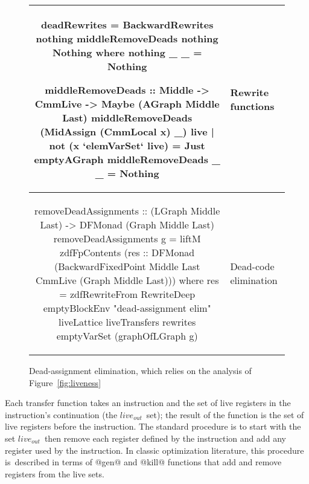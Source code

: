 \documentclass[blockstyle,preprint,nocopyrightspace]{sigplanconf}
\newcommand\seclabel[1]{\label{sec:#1}}
\newcommand\figref[1]{Figure~\ref{fig:#1}}
\newcommand\figlabel[1]{\label{fig:#1}}
\begin{document}
\seclabel{bwd-rewrite}

\begin{figure*}
\begin{tabular}{CL}
\T\begin{code}
deadRewrites = BackwardRewrites nothing middleRemoveDeads nothing Nothing
  where nothing _ _ = Nothing

middleRemoveDeads :: Middle -> CmmLive -> Maybe (AGraph Middle Last)
middleRemoveDeads (MidAssign (CmmLocal x) _) live
    | not (x `elemVarSet` live) = Just emptyAGraph
middleRemoveDeads _ _ = Nothing
\end{code}\B
& Rewrite \mbox{functions}\\
\hline

\T\begin{code}
removeDeadAssignments :: (LGraph Middle Last) -> DFMonad (Graph Middle Last)
removeDeadAssignments g =
   liftM zdfFpContents (res :: DFMonad (BackwardFixedPoint Middle Last
                                            CmmLive (Graph Middle Last)))
     where res = zdfRewriteFrom RewriteDeep emptyBlockEnv "dead-assignment elim"
                                liveLattice liveTransfers rewrites emptyVarSet
                                (graphOfLGraph g)
\end{code}%
& \mbox{Dead-code} elimination\\
\end{tabular}
\caption{Dead-assignment elimination, which relies on the analysis of
\figref{liveness}} 
\figlabel{dead-elim}
\end{figure*}

\def\liveout{$\mathit{live_{out}}$}
Each transfer function takes an instruction and
the set of live registers in the instruction's continuation (the \liveout\ set);
the result of the function is the set of live registers before the instruction.
The standard procedure is to start with the set \liveout\,
then remove each register defined by the instruction and
add any register used by the instruction.
In classic optimization literature, this procedure
is~described in terms of @gen@ and @kill@ functions
that add and remove registers from the live sets.
\end{document}
